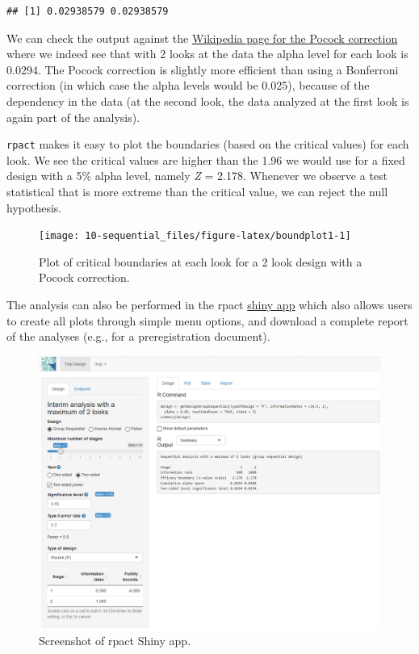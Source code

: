 \documentclass[
  oneside]{book}
\begin{document}
\begin{verbatim}
## [1] 0.02938579 0.02938579
\end{verbatim}

We can check the output against the \href{https://en.wikipedia.org/wiki/Pocock_boundary}{Wikipedia page for the Pocock correction} where we indeed see that with 2 looks at the data the alpha level for each look is 0.0294. The Pocock correction is slightly more efficient than using a Bonferroni correction (in which case the alpha levels would be 0.025), because of the dependency in the data (at the second look, the data analyzed at the first look is again part of the analysis).

\texttt{rpact} makes it easy to plot the boundaries (based on the critical values) for each look. We see the critical values are higher than the 1.96 we would use for a fixed design with a 5\% alpha level, namely \emph{Z} = 2.178. Whenever we observe a test statistical that is more extreme than the critical value, we can reject the null hypothesis.

\begin{figure}

{\centering \texttt{[image: 10-sequential\_files/figure-latex/boundplot1-1]} 

}

\caption{Plot of critical boundaries at each look for a 2 look design with a Pocock correction.}\label{fig:boundplot1}
\end{figure}

The analysis can also be performed in the rpact \href{https://rpact.shinyapps.io/public/}{shiny app} which also allows users to create all plots through simple menu options, and download a complete report of the analyses (e.g., for a preregistration document).

\begin{figure}

{\centering \includegraphics[width=1\linewidth]{images/RPact1} 

}

\caption{Screenshot of rpact Shiny app.}\label{fig:rpactshiny}
\end{figure}
\end{document}
